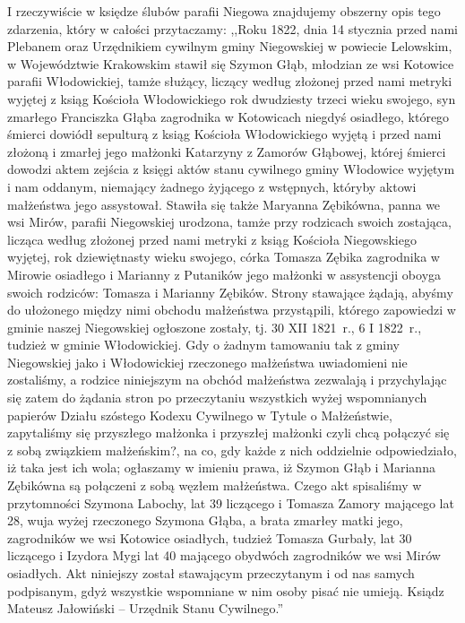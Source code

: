 I rzeczywiście w księdze ślubów parafii Niegowa znajdujemy obszerny opis tego zdarzenia, który w całości przytaczamy: ,,Roku 1822, dnia 14 stycznia przed nami Plebanem oraz Urzędnikiem cywilnym gminy Niegowskiej w powiecie Lelowskim, w  Województwie Krakowskim stawił się Szymon Głąb, młodzian ze wsi Kotowice parafii Włodowickiej, tamże służący, liczący według złożonej przed nami metryki wyjętej z ksiąg Kościoła Włodowickiego rok dwudziesty trzeci wieku swojego, syn zmarłego Franciszka Głąba zagrodnika w Kotowicach niegdyś osiadłego, którego śmierci dowiódł sepulturą z ksiąg Kościoła Włodowickiego wyjętą i przed nami złożoną i zmarłej jego małżonki Katarzyny z Zamorów Głąbowej, której śmierci dowodzi aktem zejścia z księgi aktów stanu cywilnego gminy Włodowice wyjętym i nam oddanym, niemający żadnego żyjącego z wstępnych, któryby aktowi małżeństwa jego assystował. Stawiła się także Maryanna Zębikówna, panna we wsi Mirów, parafii Niegowskiej urodzona, tamże przy rodzicach swoich zostająca, licząca według złożonej przed nami metryki z ksiąg Kościoła Niegowskiego wyjętej, rok dziewiętnasty wieku swojego, córka Tomasza Zębika  zagrodnika w Mirowie osiadłego i Marianny z Putaników jego małżonki w assystencji oboyga swoich rodziców: Tomasza i Marianny Zębików. Strony stawające żądają, abyśmy do ułożonego między nimi obchodu małżeństwa przystąpili, którego zapowiedzi w gminie naszej Niegowskiej ogłoszone zostały, tj. 30 XII 1821~r., 6 I 1822~r., tudzież w gminie Włodowickiej. Gdy o żadnym tamowaniu tak z gminy Niegowskiej jako i Włodowickiej rzeczonego małżeństwa uwiadomieni nie zostaliśmy, a rodzice niniejszym na obchód małżeństwa zezwalają i przychylając się zatem do żądania stron po przeczytaniu wszystkich wyżej wspomnianych papierów Działu szóstego Kodexu Cywilnego w Tytule o Małżeństwie, zapytaliśmy się przyszłego małżonka i przyszłej małżonki czyli chcą połączyć się z sobą związkiem małżeńskim?, na co, gdy każde z nich oddzielnie odpowiedziało, iż taka jest ich wola; ogłaszamy w imieniu prawa, iż Szymon Głąb i Marianna Zębikówna są połączeni z sobą węzłem małżeństwa. Czego akt spisaliśmy w przytomności Szymona Labochy, lat 39 liczącego i Tomasza Zamory mającego lat 28, wuja wyżej rzeczonego Szymona Głąba, a brata zmarłey matki jego, zagrodników we wsi Kotowice osiadłych, tudzież Tomasza Gurbały, lat 30 liczącego i Izydora Mygi lat 40 mającego obydwóch zagrodników we wsi Mirów osiadłych. Akt niniejszy został stawającym przeczytanym i od nas samych podpisanym, gdyż wszystkie wspomniane w nim osoby pisać nie umieją. Ksiądz Mateusz Jałowiński – Urzędnik Stanu Cywilnego.''


